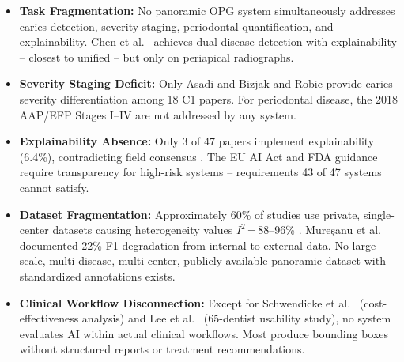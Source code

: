 \documentclass[conference]{IEEEtran}
\begin{document}
\begin{itemize}
    \item \textbf{Task Fragmentation:} No panoramic OPG system
          simultaneously addresses caries detection, severity staging,
          periodontal quantification, and explainability. Chen et al.\
          \cite{chen2023deep} achieves dual-disease detection with
          explainability -- closest to unified -- but only on periapical
          radiographs.

    \item \textbf{Severity Staging Deficit:} Only Asadi
          \cite{asadi2024detection} and Bizjak and Robic
          \cite{bizjak2024advancing} provide caries severity
          differentiation among 18 C1 papers. For periodontal disease,
          the 2018 AAP/EFP Stages I--IV \cite{chmielewski20252018} are
          not addressed by any system.

    \item \textbf{Explainability Absence:} Only 3 of 47 papers
          implement explainability (6.4\%), contradicting field
          consensus
          \cite{nassiri2025yolo,gamal2025automated,sastika2025ai,
          ferrara2025applications,khubrani2025detection}. The EU AI Act
          and FDA guidance require transparency for high-risk systems --
          requirements 43 of 47 systems cannot satisfy.

    \item \textbf{Dataset Fragmentation:} Approximately 60\% of studies
          use private, single-center datasets causing heterogeneity
          values $I^2$\,=\,88--96\%
          \cite{iacob2025automated,albano2024artificial,bonfanti2025deep}.
          Mure\c{s}anu et al.\ \cite{muresanu2024automating} documented
          22\% F1 degradation from internal to external data. No
          large-scale, multi-disease, multi-center, publicly available
          panoramic dataset with standardized annotations exists.

    \item \textbf{Clinical Workflow Disconnection:} Except for
          Schwendicke et al.\ \cite{schwendicke2021cost}
          (cost-effectiveness analysis) and Lee et al.\
          \cite{lee2025evaluation} (65-dentist usability study), no
          system evaluates AI within actual clinical workflows. Most
          produce bounding boxes without structured reports or treatment
          recommendations.
\end{itemize}
\end{document}
